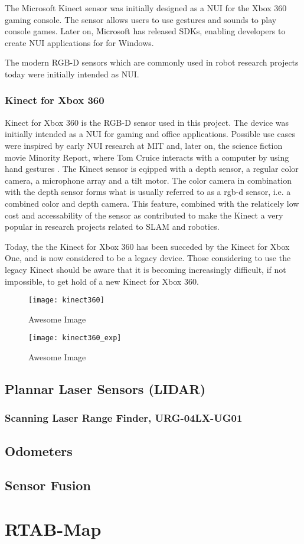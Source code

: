 The Microsoft Kinect sensor was initially designed as a \ac{NUI} for the Xbox 360 gaming console. The sensor allows users to use gestures and sounds to play console games. Later on, Microsoft has released SDKs, enabling developers to create \ac{NUI} applications for for Windows. 

The modern RGB-D sensors which are commonly used in robot research projects today were initially intended as \ac{NUI}.

\subsubsection{Kinect for Xbox 360}

Kinect for Xbox 360 is the RGB-D sensor used in this project. The device was initially intended as a \ac{NUI} for gaming and office applications. Possible use cases were inspired by early \ac{NUI} research at \ac{MIT} and, later on, the science fiction movie Minority Report, where Tom Cruice interacts with a computer by using hand gestures \cite{kinect_book}. The Kinect sensor is eqipped with a depth sensor, a regular color camera, a microphone array and a tilt motor. The color camera in combination with the depth sensor forms what is usually referred to as a rgb-d sensor, i.e. a combined color and depth camera. This feature, combined with the relaticely low cost and accessability of the sensor as contributed to make the Kinect a very popular in research projects related to \ac{SLAM} and robotics.

Today, the the Kinect for Xbox 360 has been succeded by the Kinect for Xbox One, and is now considered to be a legacy device. Those considering to use the legacy Kinect should be aware that it is becoming increasingly difficult, if not impossible, to get hold of a new Kinect for Xbox 360. 

\begin{figure}[p]
    \centering
    \texttt{[image: kinect360]}
    \caption{Awesome Image}
    \label{fig:kinect360}
\end{figure}

\begin{figure}[p]
    \centering
    \texttt{[image: kinect360\_exp]}
    \caption{Awesome Image}
    \label{fig:kinect360_exp}
\end{figure}


\subsection{Plannar Laser Sensors (LIDAR)}

\subsubsection{Scanning Laser Range Finder, URG-04LX-UG01}


\subsection{Odometers}

\subsection{Sensor Fusion}


\section{RTAB-Map}